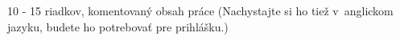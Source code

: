 \documentclass[../praca.tex]{subfiles}
\begin{document}
10 - 15 riadkov, komentovaný obsah práce (Nachystajte si ho tiež v~anglickom
jazyku, budete ho potrebovať pre prihlášku.)
\end{document}
